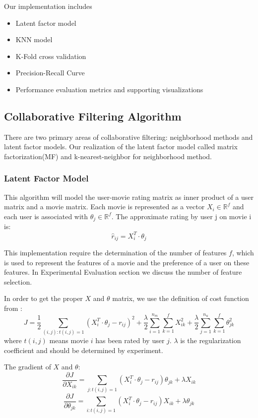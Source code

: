 \documentclass[12pt]{article}
\begin{document}
Our implementation includes 
\begin{itemize} 
	\item Latent factor model
	\item KNN model
	\item K-Fold cross validation
	\item Precision-Recall Curve 
	\item Performance evaluation metrics and supporting visualizations
\end{itemize}

\subsection{Collaborative Filtering Algorithm}

There are two primary areas of collaborative filtering: neighborhood methods and latent factor models\cite{MF}. Our realization of the latent factor model called matrix factorization(MF) and k-nearest-neighbor for neighborhood method.

\subsubsection{Latent Factor Model}
This algorithm will model the user-movie rating matrix as inner product of a user matrix and a movie matrix. Each movie is represented as a vector $X_i \in \mathbb{R}^f$ and each user is associated with $\theta_j \in \mathbb{R}^f$. The approximate rating by user j on movie i is:
$$\hat{r}_{ij} = X_i^T \cdot \theta_j$$

This implementation require the determination of the number of features $f$, which is used to represent the features of a movie and the preference of a user on these features. In Experimental Evaluation section we discuss the number of feature selection.

In order to get the proper $X$ and $\theta$ matrix, we use the definition of cost function from \cite{MF}:
$$J = \frac{1}{2}\sum_{(i,j):t(i,j)=1}(X_i^T \cdot \theta_j - r_{ij})^2+\frac{\lambda}{2}\sum_{i = 1}^{n_m}\sum_{k = 1}^{f}X_{ik}^{2}+\frac{\lambda}{2}\sum_{j = 1}^{n_u}\sum_{k = 1}^{f}\theta_{jk}^{2}$$
where $t(i,j)$ means movie $i$ has been rated by user $j$. $\lambda$ is the regularization coefficient and should be determined by experiment.

The gradient of $X$ and $\theta$:
$$\frac{\partial J}{\partial X_{ik}} = \sum_{j:t(i,j)=1}(X_i^T \cdot \theta_j - r_{ij})\theta_{jk}+\lambda X_{ik}$$
$$\frac{\partial J}{\partial \theta_{jk}} = \sum_{i:t(i,j)=1}(X_i^T \cdot \theta_j - r_{ij})X_{ik}+\lambda \theta_{jk}$$
\end{document}
